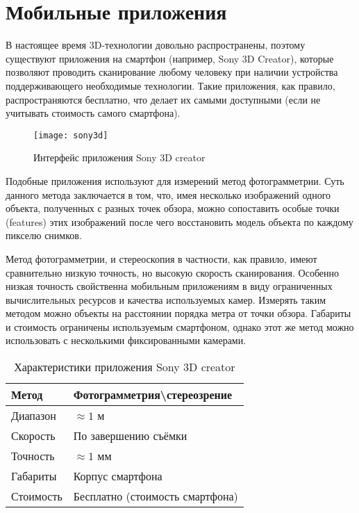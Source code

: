    \section{Мобильные приложения}
        В настоящее время 3D-технологии довольно распространены, поэтому существуют приложения на смартфон (например, Sony 3D Creator\cite{sony3d, sony3dReview}), которые позволяют проводить сканирование любому человеку при наличии устройства поддерживающего необходимые технологии. Такие приложения, как правило, распространяются бесплатно, что делает их самыми доступными (если не учитывать стоимость самого смартфона).

        \begin{figure}[H]
            \centering
            \texttt{[image: sony3d]}\label{pic:sony3d}
            \caption{Интерфейс приложения Sony 3D creator}
        \end{figure}

        Подобные приложения используют для измерений метод фотограмметрии. Суть данного метода заключается в том, что, имея несколько изображений одного объекта, полученных с разных точек обзора, можно сопоставить особые точки (features) этих изображений после чего восстановить модель объекта по каждому пикселю снимков\cite{Guzhov}.

        Метод фотограмметрии, и стереоскопия в частности, как правило, имеют сравнительно низкую точность, но высокую скорость сканирования. Особенно низкая точность свойственна мобильным приложениям в виду ограниченных вычислительных ресурсов и качества используемых камер. Измерять таким методом можно объекты на расстоянии порядка метра от точки обзора. Габариты и стоимость ограничены используемым смартфоном, однако этот же метод можно использовать с несколькими фиксированными камерами.

        \begin{table}[H]
            \centering
            \caption{Характеристики приложения Sony 3D creator}\label{table:sony3d}
            \begin{tabular}{|l|l|}\hline
                Метод&Фотограмметрия\textbackslash{}стереозрение\\ \hline
                Диапазон&$\approx 1$ м\\ \hline
                Скорость&По завершению съёмки\\ \hline
                Точность&$\approx 1$ мм\\ \hline
                Габариты&Корпус смартфона\\ \hline
                Стоимость&Бесплатно (стоимость смартфона)\\ \hline
            \end{tabular}
        \end{table}

